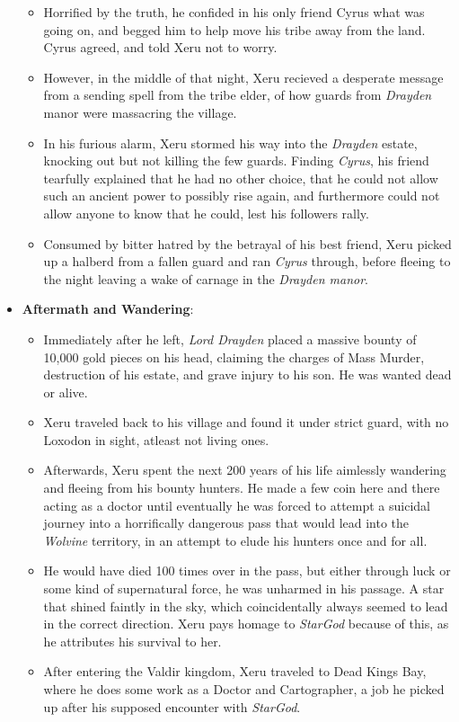 \documentclass[12pt]{article}
\begin{document}
\begin{itemize}
      \begin{itemize}
        \item Horrified by the truth, he confided in his only friend Cyrus what
          was going on, and begged him to help move his tribe away from the
          land. Cyrus agreed, and told Xeru not to worry.
        \item However, in the middle of that night, Xeru recieved a desperate
          message from a sending spell from the tribe elder, of how guards from
          \textit{Drayden} manor were massacring the village.
        \item In his furious alarm, Xeru stormed his way into the
          \textit{Drayden} estate, knocking out but not killing the few guards.
          Finding \textit{Cyrus}, his friend tearfully explained that he had no
          other choice, that he could not allow such an ancient power to
          possibly rise again, and furthermore could not allow anyone to know
          that he could, lest his followers rally.
        \item Consumed by bitter hatred by the betrayal of his best friend, Xeru
          picked up a halberd from a fallen guard and ran \textit{Cyrus}
          through, before fleeing to the night leaving a wake of carnage in the
          \textit{Drayden manor}.
      \end{itemize}
    \item \textbf{Aftermath and Wandering}:
      \begin{itemize}
        \item Immediately after he left, \textit{Lord Drayden} placed a massive
          bounty of 10,000 gold pieces on his head, claiming the charges of Mass
          Murder, destruction of his estate, and grave injury to his son. He was
          wanted dead or alive.
        \item Xeru traveled back to his village and found it under strict guard,
          with no Loxodon in sight, atleast not living ones.
        \item Afterwards, Xeru spent the next 200 years of his life aimlessly
          wandering and fleeing from his bounty hunters. He made a few coin here
          and there acting as a doctor until eventually he was forced to attempt
          a suicidal journey into a horrifically dangerous pass that would lead
          into the \textit{Wolvine} territory, in an attempt to elude his
          hunters once and for all.
        \item He would have died 100 times over in the pass, but either through
          luck or some kind of supernatural force, he was unharmed in his
          passage. A star that shined faintly in the sky, which coincidentally
          always seemed to lead in the correct direction. Xeru pays homage to
          \textit{StarGod} because of this, as he attributes his survival to
          her.
        \item After entering the Valdir kingdom, Xeru traveled to Dead Kings
          Bay, where he does some work as a Doctor and Cartographer, a job he
          picked up after his supposed encounter with \textit{StarGod}.
      \end{itemize}
  \end{itemize}
\fi
\end{document}
